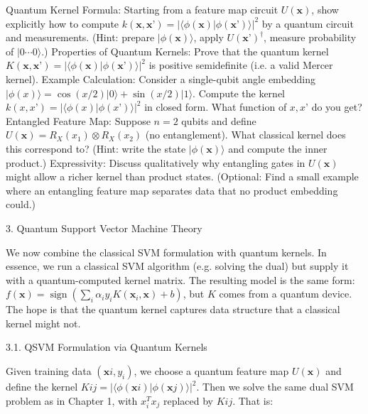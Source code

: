 Quantum Kernel Formula: Starting from a feature map circuit $U(\mathbf{x})$, show explicitly how to compute $k(\mathbf{x},\mathbf{x}’) = |\langle\phi(\mathbf{x})|\phi(\mathbf{x}’)\rangle|^2$ by a quantum circuit and measurements.  (Hint: prepare $|\phi(\mathbf{x})\rangle$, apply $U(\mathbf{x}’)^\dagger$, measure probability of $|0\cdots0\rangle$.)
Properties of Quantum Kernels: Prove that the quantum kernel $K(\mathbf{x},\mathbf{x}’) = |\langle\phi(\mathbf{x})|\phi(\mathbf{x}’)\rangle|^2$ is positive semidefinite (i.e. a valid Mercer kernel).
Example Calculation: Consider a single-qubit angle embedding $|\phi(x)\rangle = \cos(x/2)|0\rangle + \sin(x/2)|1\rangle$.  Compute the kernel $k(x,x’) = |\langle\phi(x)|\phi(x’)\rangle|^2$ in closed form.  What function of $x,x’$ do you get?
Entangled Feature Map: Suppose $n=2$ qubits and define $U(\mathbf{x}) = R_X(x_1)\otimes R_X(x_2)$ (no entanglement).  What classical kernel does this correspond to?  (Hint: write the state $|\phi(\mathbf{x})\rangle$ and compute the inner product.)
Expressivity: Discuss qualitatively why entangling gates in $U(\mathbf{x})$ might allow a richer kernel than product states.  (Optional: Find a small example where an entangling feature map separates data that no product embedding could.)






3. Quantum Support Vector Machine Theory





We now combine the classical SVM formulation with quantum kernels.  In essence, we run a classical SVM algorithm (e.g. solving the dual) but supply it with a quantum-computed kernel matrix.  The resulting model is the same form: $f(\mathbf{x})=\operatorname{sign}(\sum_i \alpha_i y_i K(\mathbf{x}_i,\mathbf{x})+b)$, but $K$ comes from a quantum device.  The hope is that the quantum kernel captures data structure that a classical kernel might not.





3.1. QSVM Formulation via Quantum Kernels





Given training data $(\mathbf{x}i,y_i)$, we choose a quantum feature map $U(\mathbf{x})$ and define the kernel $K{ij} = |\langle\phi(\mathbf{x}i)|\phi(\mathbf{x}j)\rangle|^2$.  Then we solve the same dual SVM problem as in Chapter 1, with $x_i^T x_j$ replaced by $K{ij}$.  That is:

